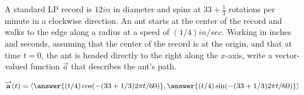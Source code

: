 \documentclass{ximera}
\begin{document}
\begin{exercise}
  A standard LP record is $12\unit{in}$ in diameter and spins at
  $33+\frac{1}{3}$ rotations per minute in a clockwise direction. An
  ant starts at the center of the record and walks to the edge along a
  radius at a speed of $(1/4)\unit{in/sec}$. Working in inches and
  seconds, assuming that the center of the record is at the origin,
  and that at time $t=0$, the ant is headed directly to the right
  along the $x$-axis, write a vector-valued function $\vec{a}$ that
  describes the ant's path.
  \begin{prompt}
    \[
    \vec{a}(t) = \vector{
      \answer{(t/4)\cos(-(33+1/3) 2\pi t/60)},
      \answer{(t/4)\sin(-(33+1/3) 2\pi t/60)}
    }
    \]
  \end{prompt}
\end{exercise}
\end{document}
